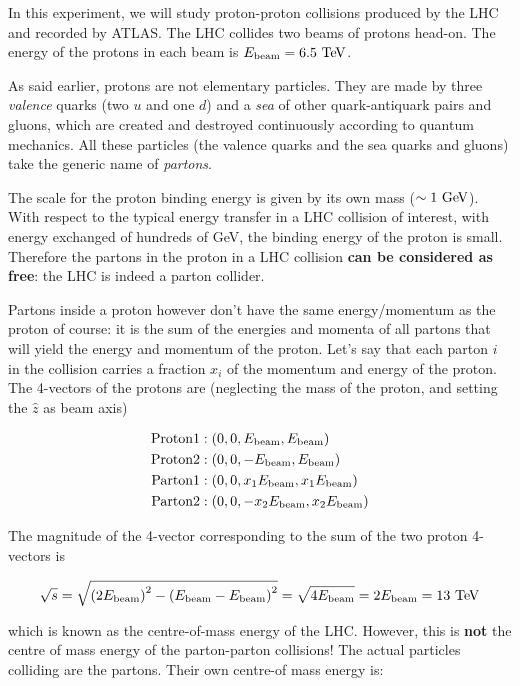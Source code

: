 In this experiment, we will study proton-proton collisions produced by the LHC and recorded by ATLAS. The LHC collides two beams of protons head-on. The energy of the protons in each beam is $E_{\mathrm{beam}} = 6.5\ \text{Te\kern -0.1em V}$. 

As said earlier, protons are not elementary particles. They are made by three \textit{valence} quarks (two $u$ and one $d$) and a \textit{sea} of other quark-antiquark pairs and gluons, which are created and destroyed continuously according to quantum mechanics. All these particles (the valence quarks and the sea quarks and gluons) take the generic name of \textit{partons}. 

The scale for the proton binding energy is given by its own mass ($\sim 1\ \text{Ge\kern -0.1em V}$). With respect to the typical energy transfer in a LHC collision of interest, with energy exchanged of hundreds of GeV, the binding energy of the proton is small. Therefore the partons in the proton in a LHC collision \textbf{can be considered as free}: the LHC is indeed a parton collider. 

Partons inside a proton however don't have the same energy/momentum as the proton of course: it is the sum of the energies and momenta of all partons that will yield the energy and momentum of the proton. Let's say that each parton $i$ in the collision carries a fraction $x_i$ of the momentum and energy of the proton. The 4-vectors of the protons are (neglecting the mass of the proton, and setting the $\hat{z}$ as beam axis) 

\begin{align*}
\mathrm{Proton 1}&: \left(0,0,E_{\mathrm{beam}},E_{\mathrm{beam}}\right) \\
\mathrm{Proton 2}&: \left(0,0,-E_{\mathrm{beam}},E_{\mathrm{beam}}\right) \\
\mathrm{Parton 1}&: \left(0,0,x_1E_{\mathrm{beam}},x_1E_{\mathrm{beam}}\right) \\
\mathrm{Parton 2}&: \left(0,0,-x_2E_{\mathrm{beam}},x_2E_{\mathrm{beam}}\right) \\
\end{align*}

The magnitude of the 4-vector corresponding to the sum of the two proton 4-vectors is 

\begin{align*}
\sqrt{s} = \sqrt{\left(2E_{\mathrm{beam}}\right)^2 - \left(E_{\mathrm{beam}}-E_{\mathrm{beam}}\right)^2} = \sqrt{4E_{\mathrm{beam}}} = 2E_{\mathrm{beam}} = 13\ \text{Te\kern -0.1em V}
\end{align*}

\noindent which is known as the centre-of-mass energy of the LHC. However, this is \textbf{not} the centre of mass energy of the parton-parton collisions! The actual particles colliding are the partons. Their own centre-of mass energy is:


